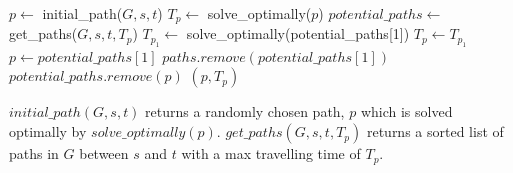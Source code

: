 \begin{algorithmic}
    \State $p \gets$ initial\_path($G,s,t$) 
    \State $T_p \gets$ solve\_optimally($p$)
    \State $potential\_paths \gets$ get\_paths($G,s,t,T_p$)
    \Repeat 
    	\State $T_{p_1} \gets$ solve\_optimally(potential\_paths[1])
    		\State $T_p \gets T_{p_1}$
    		\State $p \gets potential\_paths[1]$ 
    	\EndIf  
    	\State $paths.remove(potential\_paths[1])$
    			\State $potential\_paths.remove(p)$
    		\EndIf
    	\EndFor
    \State \Return $(p, T_p)$
\EndFunction
\end{algorithmic}

$initial\_path(G,s,t)$ returns a randomly chosen path, $p$ which is solved optimally by $solve\_optimally(p)$. $get\_paths(G,s,t,T_p)$ returns a sorted list of paths in $G$ between $s$ and $t$ with a max travelling time of $T_p$.

%
%
%
%
%
%


